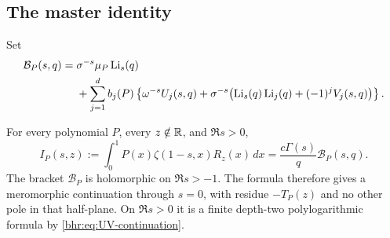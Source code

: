 \subsection{The master identity}

Set
\begin{align}\label{bhr:eq:Bpoly}
 \mathcal B_P(s,q)
   ={}&\sigma^{-s}\mu_P\operatorname{Li}_s(q)\notag\\
    &+\sum_{j=1}^d b_j(P)
       \left\{\omega^{-s}U_j(s,q)
        +\sigma^{-s}\bigl(\operatorname{Li}_s(q)\operatorname{Li}_j(q)
                              +(-1)^jV_j(s,q)\bigr)\right\}.
\end{align}

\begin{theorem}\label{bhr:thm:weighted-master}
For every polynomial $P$, every $z\notin\mathbb R$, and $\Re s>0$,
\begin{equation}\label{bhr:eq:weighted-master}
 \boxed{\displaystyle
 I_P(s,z):=\int_0^1P(x)\zeta(1-s,x)R_z(x)\,dx
          =\frac{c\Gamma(s)}q\mathcal B_P(s,q).}
\end{equation}
The bracket $\mathcal B_P$ is holomorphic on $\Re s>-1$.
The formula therefore gives a meromorphic continuation through
$s=0$, with residue $-T_P(z)$ and no other pole in that half-plane.
On $\Re s>0$ it is a finite depth-two polylogarithmic formula
by \eqref{bhr:eq:UV-continuation}.
\end{theorem}


